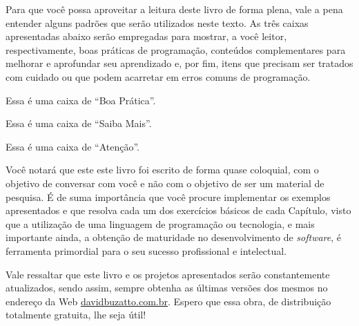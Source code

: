 Para que você possa aproveitar a leitura deste livro de forma plena, vale a pena entender alguns padrões que serão utilizados neste texto. As três caixas apresentadas abaixo serão empregadas para mostrar, a você leitor, respectivamente, boas práticas de programação, conteúdos complementares para melhorar e aprofundar seu aprendizado e, por fim, itens que precisam ser tratados com cuidado ou que podem acarretar em erros comuns de programação.

\begin{boaPratica}
    Essa é uma caixa de ``Boa Prática''.
\end{boaPratica}

\begin{saibaMais}
    Essa é uma caixa de ``Saiba Mais''.
\end{saibaMais}

\begin{atencao}
    Essa é uma caixa de ``Atenção''.
\end{atencao}

Você notará que este este livro foi escrito de forma quase coloquial, com o objetivo de conversar com você e não com o objetivo de ser um material de pesquisa. É de suma importância que você procure implementar os exemplos apresentados e que resolva cada um dos exercícios básicos de cada Capítulo, visto que a utilização de uma linguagem de programação ou tecnologia, e mais importante ainda, a obtenção de maturidade no desenvolvimento de \textit{software}, é ferramenta primordial para o seu sucesso profissional e intelectual.

Vale ressaltar que este livro e os projetos apresentados serão constantemente atualizados, sendo assim, sempre obtenha as últimas versões dos mesmos no endereço da Web \textcolor{corTema}{\href{http://davidbuzatto.com.br}{davidbuzatto.com.br}}. Espero que essa obra, de distribuição totalmente gratuita, lhe seja útil!

\vspace*{\fill}
